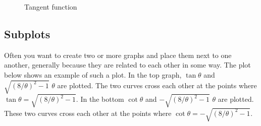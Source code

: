 \documentclass[letterpaper,10pt,english]{sphinxmanual}
\begin{document}
\begin{figure}[htbp]
\centering
\capstart

\noindent{}
\caption{Tangent function}\label{\detokenize{chap5/chap5_plot:id7}}\label{\detokenize{chap5/chap5_plot:fig-plotlimits3}}\end{figure}

\begin{sphinxVerbatim}[commandchars=\\\{\},numbers=left,firstnumber=1,stepnumber=1]
   
   

    
  
   

 
 
 

\end{sphinxVerbatim}


\subsection{Subplots}
\label{\detokenize{chap5/chap5_plot:subplots}}
\ignorespaces 
\sphinxAtStartPar
Often you want to create two or more graphs and place them next to one another, generally because they are related to each other in some way.  The plot below shows an example of such a plot.  In the top graph, \(\tan\theta\) and \(\sqrt{(8/\theta)^2-1}\)  \(\theta\) are plotted.  The two curves cross each other at the points where \(\tan\theta=\sqrt{(8/\theta)^2-1}\).  In the bottom  \(\cot\theta\) and \(-\sqrt{(8/\theta)^2-1}\)  \(\theta\) are plotted.  These two curves cross each other at the points where \(\cot\theta=-\sqrt{(8/\theta)^2-1}\).
\end{document}
